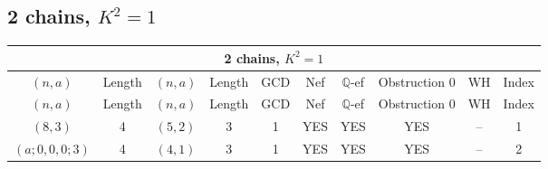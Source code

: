 \subsection{2 chains, $K^2 = 1$}
\begin{longtable}{|c|c|c|c|c|c|c|c|c|c|}
\hline
\multicolumn{10}{|c|}{2 chains, $K^2 = 1$}\\
\hline
$(n,a)$ & Length & $(n,a)$ & Length & GCD & Nef & $\mathbb Q$-ef & Obstruction 0 & WH & Index\\
\hline
\endfirsthead

\hline
$(n,a)$ & Length & $(n,a)$ & Length & GCD & Nef & $\mathbb Q$-ef & Obstruction 0 & WH & Index\\
\hline
\endhead
\hline
\endfoot

$(8, 3)$ & 4 & $(5, 2)$ & 3 & 1 & YES & YES & YES & -- & 1\\
$(a; 0, 0, 0; 3)$ & 4 & $(4, 1)$ & 3 & 1 & YES & YES & YES & -- & 2
\end{longtable}
